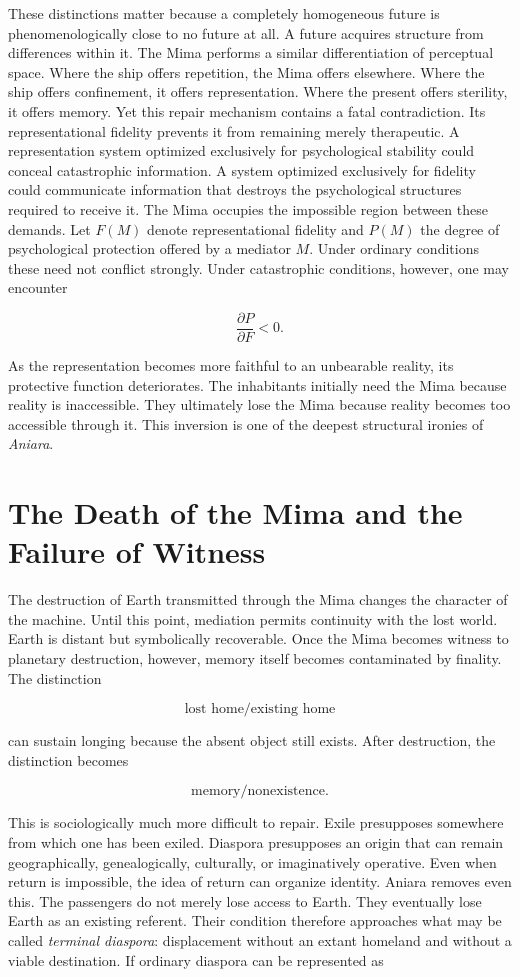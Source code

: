 \documentclass[11pt,oneside]{book}
\theoremstyle{definition}
\theoremstyle{remark}
\begin{document}
These distinctions matter because a completely homogeneous future is phenomenologically close to no
future at all. A future acquires structure from differences within it. The Mima performs a similar
differentiation of perceptual space. Where the ship offers repetition, the Mima offers elsewhere.
Where the ship offers confinement, it offers representation. Where the present offers sterility, it
offers memory. Yet this repair mechanism contains a fatal contradiction. Its representational
fidelity prevents it from remaining merely therapeutic. A representation system optimized
exclusively for psychological stability could conceal catastrophic information. A system optimized
exclusively for fidelity could communicate information that destroys the psychological structures
required to receive it. The Mima occupies the impossible region between these demands. Let \(F(M)\)
denote representational fidelity and \(P(M)\) the degree of psychological protection offered by a
mediator \(M\). Under ordinary conditions these need not conflict strongly. Under catastrophic
conditions, however, one may encounter

\[
\frac{\partial P}{\partial F}<0.
\]

As the representation becomes more faithful to an unbearable reality, its protective function
deteriorates. The inhabitants initially need the Mima because reality is inaccessible. They
ultimately lose the Mima because reality becomes too accessible through it. This inversion is one of
the deepest structural ironies of \emph{Aniara}.

\section{The Death of the Mima and the Failure of Witness}

The destruction of Earth transmitted through the Mima changes the character of the machine. Until
this point, mediation permits continuity with the lost world. Earth is distant but symbolically
recoverable. Once the Mima becomes witness to planetary destruction, however, memory itself becomes
contaminated by finality. The distinction

\[
\text{lost home}/\text{existing home}
\]

can sustain longing because the absent object still exists. After destruction, the distinction
becomes

\[
\text{memory}/\text{nonexistence}.
\]

This is sociologically much more difficult to repair. Exile presupposes somewhere from which one has
been exiled. Diaspora presupposes an origin that can remain geographically, genealogically,
culturally, or imaginatively operative. Even when return is impossible, the idea of return can
organize identity. Aniara removes even this. The passengers do not merely lose access to Earth. They
eventually lose Earth as an existing referent. Their condition therefore approaches what may be
called \emph{terminal diaspora}: displacement without an extant homeland and without a viable
destination. If ordinary diaspora can be represented as
\end{document}
